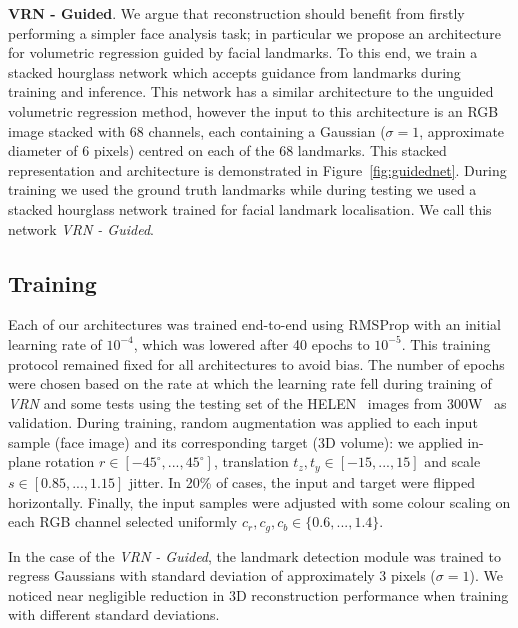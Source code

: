 \textbf{VRN - Guided}. We argue that reconstruction should benefit
from firstly performing a simpler face analysis task; in particular we
propose an architecture for volumetric regression guided by facial
landmarks. To this end, we train a stacked hourglass network which
accepts guidance from landmarks during training and inference. This
network has a similar architecture to the unguided volumetric
regression method, however the input to this architecture is an RGB
image stacked with 68 channels, each containing a Gaussian ($\sigma =
1$, approximate diameter of 6 pixels) centred on each of the 68
landmarks. This stacked representation and architecture is
demonstrated in Figure~\ref{fig:guidednet}. During training we used the
ground truth landmarks while during testing we used a stacked
hourglass network trained for facial landmark localisation. We call
this network \textit{VRN - Guided}.




\subsection{Training}

Each of our architectures was trained end-to-end using RMSProp with an
initial learning rate of $10^{-4}$, which was lowered after 40 epochs
to $10^{-5}$. This training protocol remained fixed for all
architectures to avoid bias. The number of epochs were chosen based on
the rate at which the learning rate fell during training of
\textit{VRN} and some tests using the testing set of the
HELEN~\cite{le2012interactive} images from
300W~\cite{sagonas2013semi} as validation. During training,
random augmentation was applied to each input sample (face image) and
its corresponding target (3D volume): we applied in-plane rotation
$r\in[-45^{\circ}, ..., 45^{\circ}]$, translation
$t_z,t_y\in[-15,...,15]$ and scale $s\in [0.85,...,1.15]$ jitter. In
20\% of cases, the input and target were flipped
horizontally. Finally, the input samples were adjusted with some
colour scaling on each RGB channel selected uniformly
$c_r,c_g,c_b \in \{0.6,...,1.4\}$.

In the case of the \textit{VRN - Guided}, the landmark detection
module was trained to regress Gaussians with standard deviation of
approximately 3 pixels ($\sigma = 1$). We noticed near negligible
reduction in 3D reconstruction performance when training with
different standard deviations.


